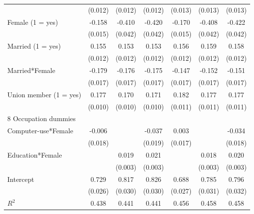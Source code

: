\begin{tabular}{l*{6}{c}}
            &     (0.012)&     (0.012)&     (0.012)&     (0.013)&     (0.013)&     (0.013)\\
Female (1 = yes)&      -0.158&      -0.410&      -0.420&      -0.170&      -0.408&      -0.422\\
            &     (0.015)&     (0.042)&     (0.042)&     (0.015)&     (0.042)&     (0.042)\\
Married (1 = yes)&       0.155&       0.153&       0.153&       0.156&       0.159&       0.158\\
            &     (0.012)&     (0.012)&     (0.012)&     (0.012)&     (0.012)&     (0.012)\\
Married*Female&      -0.179&      -0.176&      -0.175&      -0.147&      -0.152&      -0.151\\
            &     (0.017)&     (0.017)&     (0.017)&     (0.017)&     (0.017)&     (0.017)\\
Union member (1 = yes)&       0.177&       0.170&       0.171&       0.182&       0.177&       0.177\\
            &     (0.010)&     (0.010)&     (0.010)&     (0.011)&     (0.011)&     (0.011)\\
8 Occupation dummies&            &            &            &            &            &            \\
Computer-use*Female&      -0.006&            &      -0.037&       0.003&            &      -0.034\\
            &     (0.018)&            &     (0.019)&     (0.017)&            &     (0.018)\\
Education*Female&            &       0.019&       0.021&            &       0.018&       0.020\\
            &            &     (0.003)&     (0.003)&            &     (0.003)&     (0.003)\\
Intercept   &       0.729&       0.817&       0.826&       0.688&       0.785&       0.796\\
            &     (0.026)&     (0.030)&     (0.030)&     (0.027)&     (0.031)&     (0.032)\\
\hline
\(R^{2}\)   &       0.438&       0.441&       0.441&       0.456&       0.458&       0.458\\
\hline\hline
\end{tabular}

